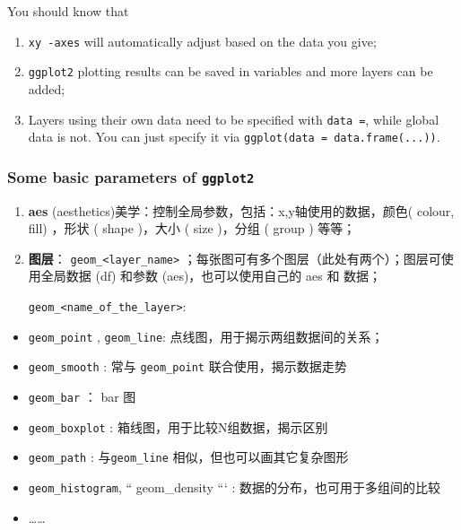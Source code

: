 \documentclass[
]{article}
\begin{document}
You should know that

\begin{enumerate}
\def\labelenumi{\arabic{enumi}.}
\item
  \texttt{xy\ -axes} will automatically adjust based on the data you
  give;
\item
  \texttt{ggplot2} plotting results can be saved in variables and more
  layers can be added;
\item
  Layers using their own data need to be specified with
  \texttt{data\ =}, while global data is not. You can just specify it
  via \texttt{ggplot(data\ =\ data.frame(...))}.
\end{enumerate}

\hypertarget{some-basic-parameters-of-ggplot2}{%
\subsubsection{\texorpdfstring{Some basic parameters of
\texttt{ggplot2}}{Some basic parameters of ggplot2}}\label{some-basic-parameters-of-ggplot2}}

\begin{enumerate}
\def\labelenumi{\arabic{enumi}.}
\item
  \textbf{aes}
  (aesthetics)美学：控制全局参数，包括：x,y轴使用的数据，颜色( colour,
  fill) ，形状 ( shape )，大小 ( size )，分组 ( group ) 等等；
\item
  \textbf{图层}： \texttt{geom\_\textless{}layer\_name\textgreater{}}
  ；每张图可有多个图层（此处有两个）；图层可使用全局数据 (df) 和参数
  (aes)，也可以使用自己的 aes 和 数据；

  \texttt{geom\_\textless{}name\_of\_the\_layer\textgreater{}}:
\end{enumerate}

\begin{itemize}
\item
  \texttt{geom\_point} , \texttt{geom\_line}:
  点线图，用于揭示两组数据间的关系；
\end{itemize}

\begin{itemize}
\item
  \texttt{geom\_smooth} : 常与 \texttt{geom\_point}
  联合使用，揭示数据走势
\item
  \texttt{geom\_bar} ： bar 图
\item
  \texttt{geom\_boxplot} : 箱线图，用于比较N组数据，揭示区别
\item
  \texttt{geom\_path} : 与\texttt{geom\_line}
  相似，但也可以画其它复杂图形
\item
  \texttt{geom\_histogram}, `` geom\_density ``` :
  数据的分布，也可用于多组间的比较
\item
  \ldots\ldots{}
\end{itemize}
\end{document}
